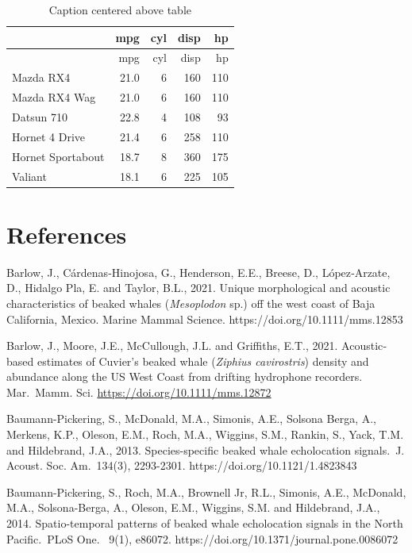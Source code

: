 \documentclass[
  letterpaper,
  DIV=11,
  numbers=noendperiod]{scrartcl}
\begin{document}
\hypertarget{tbl-simple}{}
\begin{longtable}[]{@{}lrrrr@{}}
\caption{\label{tbl-simple}Caption centered above table}\tabularnewline
\toprule()
& mpg & cyl & disp & hp \\
\midrule()
\endfirsthead
\toprule()
& mpg & cyl & disp & hp \\
\midrule()
\endhead
Mazda RX4 & 21.0 & 6 & 160 & 110 \\
Mazda RX4 Wag & 21.0 & 6 & 160 & 110 \\
Datsun 710 & 22.8 & 4 & 108 & 93 \\
Hornet 4 Drive & 21.4 & 6 & 258 & 110 \\
Hornet Sportabout & 18.7 & 8 & 360 & 175 \\
Valiant & 18.1 & 6 & 225 & 105 \\
\bottomrule()
\end{longtable}

\hypertarget{references}{%
\section*{References}\label{references}}

Barlow, J., Cárdenas‐Hinojosa, G., Henderson, E.E., Breese, D.,
López‐Arzate, D., Hidalgo Pla, E. and Taylor, B.L., 2021. Unique
morphological and acoustic characteristics of beaked whales
(\emph{Mesoplodon} sp.) off the west coast of Baja California, Mexico.
Marine Mammal Science. https://doi.org/10.1111/mms.12853

Barlow, J., Moore, J.E., McCullough, J.L. and Griffiths, E.T., 2021.
Acoustic‐based estimates of Cuvier's beaked whale (\emph{Ziphius
cavirostris}) density and abundance along the US West Coast from
drifting hydrophone recorders. Mar.~Mamm. Sci.
\url{https://doi.org/10.1111/mms.12872}

Baumann-Pickering, S., McDonald, M.A., Simonis, A.E., Solsona Berga, A.,
Merkens, K.P., Oleson, E.M., Roch, M.A., Wiggins, S.M., Rankin, S.,
Yack, T.M. and Hildebrand, J.A., 2013. Species-specific beaked whale
echolocation signals.~J. Acoust. Soc. Am.~134(3), 2293-2301.
https://doi.org/10.1121/1.4823843

Baumann-Pickering, S., Roch, M.A., Brownell Jr, R.L., Simonis, A.E.,
McDonald, M.A., Solsona-Berga, A., Oleson, E.M., Wiggins, S.M. and
Hildebrand, J.A., 2014. Spatio-temporal patterns of beaked whale
echolocation signals in the North Pacific.~PLoS One. ~9(1), e86072.
https://doi.org/10.1371/journal.pone.0086072
\end{document}

